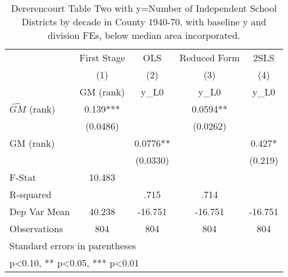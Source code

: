 \begin{table}[htbp]\centering
\def\sym#1{\ifmmode^{#1}\else\(^{#1}\)\fi}
\caption{Dererencourt Table Two with y=Number of Independent School Districts by decade in County 1940-70, with baseline y and division FEs, below median area incorporated.}
\begin{tabular}{l*{4}{c}}
\toprule
                    & First Stage   &         OLS   &Reduced Form   &        2SLS   \\
                    &\multicolumn{1}{c}{(1)}&\multicolumn{1}{c}{(2)}&\multicolumn{1}{c}{(3)}&\multicolumn{1}{c}{(4)}\\
                    &\multicolumn{1}{c}{GM  (rank)}&\multicolumn{1}{c}{y\_L0}&\multicolumn{1}{c}{y\_L0}&\multicolumn{1}{c}{y\_L0}\\
\midrule
$\hat{GM}$ (rank)   &       0.139***&               &      0.0594** &               \\
                    &    (0.0486)   &               &    (0.0262)   &               \\
\addlinespace
GM  (rank)          &               &      0.0776** &               &       0.427*  \\
                    &               &    (0.0330)   &               &     (0.219)   \\
\midrule
F-Stat              &      10.483   &               &               &               \\
R-squared           &               &        .715   &        .714   &               \\
Dep Var Mean        &      40.238   &     -16.751   &     -16.751   &     -16.751   \\
Observations        &         804   &         804   &         804   &         804   \\
\bottomrule
\multicolumn{5}{l}{\footnotesize Standard errors in parentheses}\\
\multicolumn{5}{l}{\footnotesize * p<0.10, ** p<0.05, *** p<0.01}\\
\end{tabular}
\end{table}
